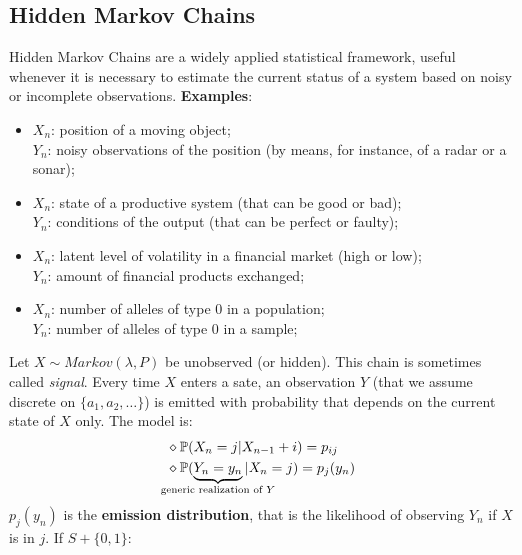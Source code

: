 \documentclass{article}
\begin{document}
\subsection{Hidden Markov Chains}
Hidden Markov Chains are a widely applied statistical framework, useful whenever it is necessary to estimate the current status of a system based on noisy or incomplete observations.
\textbf{Examples}:\begin{itemize}
    \item $X_n$: position of a moving object;\\
    $Y_n$: noisy observations of the position (by means, for instance, of a radar or a sonar);
    \item $X_n$: state of a productive system (that can be good or bad);\\
    $Y_n$: conditions of the output (that can be perfect or faulty);
    \item $X_n$: latent level of volatility in a financial market (high or low);\\
    $Y_n$: amount of financial products exchanged;
    \item $X_n$: number of alleles of type 0 in a population;\\
    $Y_n$: number of alleles of type 0 in a sample;
\end{itemize}
Let $X\sim Markov(\lambda, P)$ be unobserved (or hidden). This chain is sometimes called \textit{signal}. Every time $X$ enters a sate, an observation $Y$ (that we assume discrete on $\{a_1, a_2,\ldots\}$) is emitted with probability that depends on the current state of $X$ only. The model is:
\begin{align*}
    &\diamond \prob(X_n=j|X_{n-1}+i)=p_{ij}\\
    &\diamond \prob(\underbrace{Y_n=y_n}_{\mathclap{\text{generic realization of }Y}}|X_n=j)=p_j(y_n)
\end{align*}
$p_j(y_n)$ is the \textbf{emission distribution}, that is the likelihood of observing $Y_n$ if $X$ is in $j$. If $S+\{0,1\}$:
\end{document}
